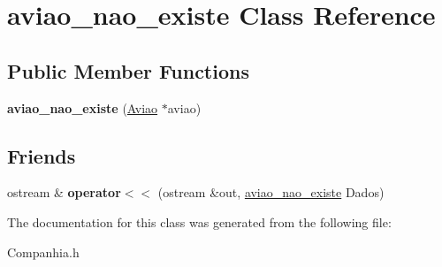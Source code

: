 \hypertarget{classaviao__nao__existe}{
\section{aviao\_\-nao\_\-existe Class Reference}
\label{classaviao__nao__existe}
}
\subsection*{Public Member Functions}
\begin{DoxyCompactItemize}
\item 
\hypertarget{classaviao__nao__existe_a817c62ba3a5c0e9802c083e3474bf35c}{
{\bfseries aviao\_\-nao\_\-existe} (\hyperlink{class_aviao}{Aviao} $\ast$aviao)}
\label{classaviao__nao__existe_a817c62ba3a5c0e9802c083e3474bf35c}

\end{DoxyCompactItemize}
\subsection*{Friends}
\begin{DoxyCompactItemize}
\item 
\hypertarget{classaviao__nao__existe_a37e42e4d7290ff60c53f55e18e5401e3}{
ostream \& {\bfseries operator$<$$<$} (ostream \&out, \hyperlink{classaviao__nao__existe}{aviao\_\-nao\_\-existe} Dados)}
\label{classaviao__nao__existe_a37e42e4d7290ff60c53f55e18e5401e3}

\end{DoxyCompactItemize}


The documentation for this class was generated from the following file:\begin{DoxyCompactItemize}
\item 
Companhia.h\end{DoxyCompactItemize}
